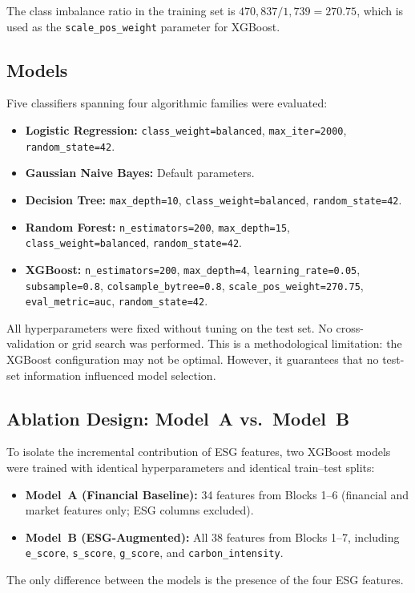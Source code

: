 \documentclass[sigconf,anonymous]{acmart}
\begin{document}
The class imbalance ratio in the training set is $470{,}837 / 1{,}739 = 270.75$, which is used as the \texttt{scale\_pos\_weight} parameter for XGBoost.

\subsection{Models}
Five classifiers spanning four algorithmic families were evaluated:
\begin{itemize}
    \item \textbf{Logistic Regression:} \texttt{class\_weight=balanced}, \texttt{max\_iter=2000}, \texttt{random\_state=42}.
    \item \textbf{Gaussian Naive Bayes:} Default parameters.
    \item \textbf{Decision Tree:} \texttt{max\_depth=10}, \texttt{class\_weight=balanced}, \texttt{random\_state=42}.
    \item \textbf{Random Forest:} \texttt{n\_estimators=200}, \texttt{max\_depth=15}, \texttt{class\_weight=balanced}, \texttt{random\_state=42}.
    \item \textbf{XGBoost:} \texttt{n\_estimators=200}, \texttt{max\_depth=4}, \texttt{learning\_rate=0.05}, \texttt{subsample=0.8}, \texttt{colsample\_bytree=0.8}, \texttt{scale\_pos\_weight=270.75}, \texttt{eval\_metric=auc}, \texttt{random\_state=42}.
\end{itemize}

All hyperparameters were fixed without tuning on the test set. No cross-validation or grid search was performed. This is a methodological limitation: the XGBoost configuration may not be optimal. However, it guarantees that no test-set information influenced model selection.

\subsection{Ablation Design: Model~A vs.\ Model~B}
To isolate the incremental contribution of ESG features, two XGBoost models were trained with identical hyperparameters and identical train--test splits:
\begin{itemize}
    \item \textbf{Model~A (Financial Baseline):} 34 features from Blocks 1--6 (financial and market features only; ESG columns excluded).
    \item \textbf{Model~B (ESG-Augmented):} All 38 features from Blocks 1--7, including \texttt{e\_score}, \texttt{s\_score}, \texttt{g\_score}, and \texttt{carbon\_intensity}.
\end{itemize}
The only difference between the models is the presence of the four ESG features.
\end{document}
